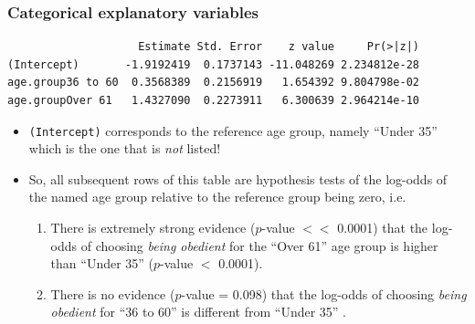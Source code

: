 \documentclass{beamer}\usepackage[]{graphicx}\usepackage[]{color}
\makeatletter
\newenvironment{kframe}{%
 \def\at@end@of@kframe{}%
 \ifinner\ifhmode%
  \def\at@end@of@kframe{\end{minipage}}%
  \begin{minipage}{\columnwidth}%
 \fi\fi%
 \def\FrameCommand##1{\hskip\@totalleftmargin \hskip-\fboxsep
 \colorbox{shadecolor}{##1}\hskip-\fboxsep
     \hskip-\linewidth \hskip-\@totalleftmargin \hskip\columnwidth}%
 \MakeFramed {\advance\hsize-\width
   \@totalleftmargin\z@ \linewidth\hsize
   \@setminipage}}%
 {\par\unskip\endMakeFramed%
 \at@end@of@kframe}
\newenvironment{knitrout}{}{} %
\makeatother
\begin{document}
\begin{frame}[fragile]
\frametitle{Categorical explanatory variables}
\begin{knitrout}\small
{}\color{fgcolor}\begin{kframe}
\begin{verbatim}
                    Estimate Std. Error    z value     Pr(>|z|)
(Intercept)       -1.9192419  0.1737143 -11.048269 2.234812e-28
age.group36 to 60  0.3568389  0.2156919   1.654392 9.804798e-02
age.groupOver 61   1.4327090  0.2273911   6.300639 2.964214e-10
\end{verbatim}
\end{kframe}
\end{knitrout}
\begin{itemize}
  \item \texttt{(Intercept)} corresponds to the reference age group, namely
  ``Under 35'' which is the one that is {\em not} listed!
  \item So, all subsequent rows of this table are hypothesis tests of the
  log-odds of the named age group relative to the reference group being
  zero, i.e.
  \begin{enumerate}
    \item There is extremely strong evidence ($p$-value $<<$ 0.0001) that
    the log-odds of choosing {\em being obedient} for the ``Over 61'' age
    group is higher than ``Under 35'' ($p$-value $<$ 0.0001).
    \item There is no evidence ($p$-value = 0.098) that the log-odds of
    choosing {\em being obedient} for ``36 to 60'' is different from
    ``Under 35'' .
  \end{enumerate}
\end{itemize}
\end{frame}
\end{document}
